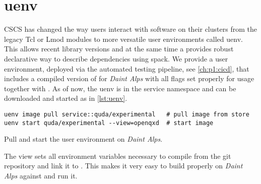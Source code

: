 \section{uenv}
\label{sec:building:uenv}

CSCS has changed the way users interact with software on their clusters from the legacy Tcl\cite{online:tcl} or Lmod\cite{github:lmod} modules to more versatile user environments called uenv.
This allows recent library versions and at the same time a provides robust declarative way to describe dependencies using spack.
We provide a user environment, deployed via the automated testing pipeline, see \cref{ch:p1:cicd}, that includes a compiled version of \quda for \emph{Daint Alps} with all flags set properly for usage together with \openqxd.
As of now, the uenv is in the service namespace and can be downloaded and started as in \cref{lst:uenv}.
\begin{codelisting}
\begin{verbatim}
uenv image pull service::quda/experimental   # pull image from store
uenv start quda/experimental --view=openqxd  # start image
\end{verbatim}
\caption{Pull and start the \quda user environment on \emph{Daint Alps}.}
\label{lst:uenv}
\end{codelisting}
The view  sets all environment variables necessary to compile \openqxd from the git repository and link it to \quda.
This makes it very easy to build \openqxd properly on \emph{Daint Alps} against \quda and run it.

